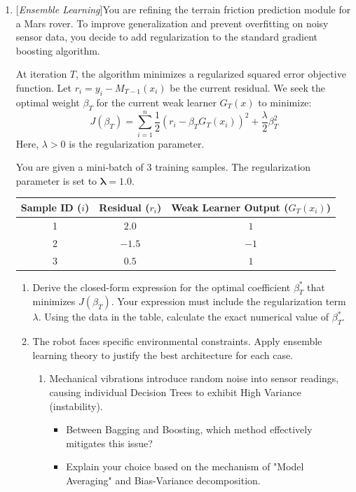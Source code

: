 \documentclass[10pt]{article}
\begin{document}
\begin{enumerate}
\item {} [\textit{Ensemble Learning}]You are refining the terrain friction prediction module for a Mars rover. To improve generalization and prevent overfitting on noisy sensor data, you decide to add regularization to the standard gradient boosting algorithm.

At iteration $T$, the algorithm minimizes a regularized squared error objective function.
Let $r_i = y_i - M_{T-1}(x_i)$ be the current residual. We seek the optimal weight $\beta_T$ for the current weak learner $G_T(x)$ to minimize:
$$
J(\beta_T) = \sum_{i=1}^n \frac{1}{2} (r_i - \beta_T G_T(x_i))^2 + \frac{\lambda}{2} \beta_T^2
$$
Here, $\lambda > 0$ is the regularization parameter.

You are given a mini-batch of 3 training samples.
The regularization parameter is set to $\mathbf{\lambda = 1.0}$.

\begin{table}[h]
\centering
\begin{tabular}{|c|c|c|}
\hline
\textbf{Sample ID} ($i$) & \textbf{Residual} ($r_i$) & \textbf{Weak Learner Output} ($G_T(x_i)$) \\
\hline
1 & $2.0$  & $1$ \\
\hline
2 & $-1.5$ & $-1$ \\
\hline
3 & $0.5$  & $1$ \\
\hline
\end{tabular}
\end{table}
\begin{enumerate}
    \item Derive the closed-form expression for the optimal coefficient $\beta_T^*$ that minimizes $J(\beta_T)$. Your expression must include the regularization term $\lambda$. Using the data in the table, calculate the exact numerical value of $\beta_T^*$. 
    
    \item The robot faces specific environmental constraints. Apply ensemble learning theory to justify the best architecture for each case.

\begin{enumerate}
    \item 
    Mechanical vibrations introduce random noise into sensor readings, causing individual Decision Trees to exhibit High Variance (instability).
    \begin{itemize}
        \item Between Bagging and Boosting, which method effectively mitigates this issue?
        \item Explain your choice based on the mechanism of "Model Averaging" and Bias-Variance decomposition.
    \end{itemize}


\end{enumerate}
\end{enumerate}
\end{enumerate}
\end{document}
